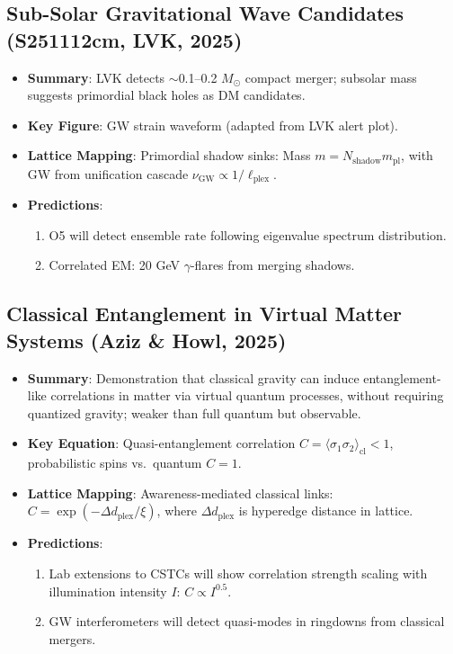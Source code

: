 \documentclass[11pt,a4paper]{article}
\begin{document}
\subsection{Sub-Solar Gravitational Wave Candidates (S251112cm, LVK, 2025)}

\begin{itemize}
\item \textbf{Summary}: LVK detects $\sim$0.1--0.2 $M_\odot$ compact merger; subsolar mass suggests primordial black holes as DM candidates.

\item \textbf{Key Figure}: GW strain waveform (adapted from LVK alert plot).

\item \textbf{Lattice Mapping}: Primordial shadow sinks: Mass $m = N_{\mathrm{shadow}} m_{\mathrm{pl}}$, with GW from unification cascade $\nu_{\mathrm{GW}} \propto 1/\ell_{\mathrm{plex}}$.

\item \textbf{Predictions}:
\begin{enumerate}
\item O5 will detect ensemble rate following eigenvalue spectrum distribution.
\item Correlated EM: 20 GeV $\gamma$-flares from merging shadows.
\end{enumerate}
\end{itemize}

\subsection{Classical Entanglement in Virtual Matter Systems (Aziz \& Howl, 2025)}

\begin{itemize}
\item \textbf{Summary}: Demonstration that classical gravity can induce entanglement-like correlations in matter via virtual quantum processes, without requiring quantized gravity; weaker than full quantum but observable.

\item \textbf{Key Equation}: Quasi-entanglement correlation $C = \langle \sigma_1 \sigma_2 \rangle_{\mathrm{cl}} < 1$, probabilistic spins vs.\ quantum $C=1$.

\item \textbf{Lattice Mapping}: Awareness-mediated classical links: $C = \exp(-\Delta d_{\mathrm{plex}}/\xi)$, where $\Delta d_{\mathrm{plex}}$ is hyperedge distance in lattice.

\item \textbf{Predictions}:
\begin{enumerate}
\item Lab extensions to CSTCs will show correlation strength scaling with illumination intensity $I$: $C \propto I^{0.5}$.
\item GW interferometers will detect quasi-modes in ringdowns from classical mergers.
\end{enumerate}
\end{itemize}
\end{document}
